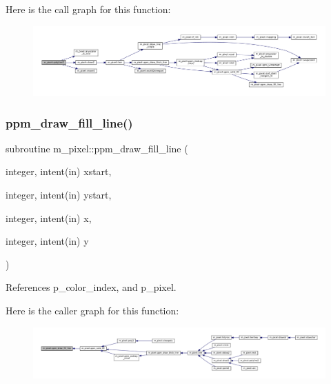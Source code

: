 Here is the call graph for this function\+:
\nopagebreak
\begin{figure}[H]
\begin{center}
\leavevmode
\includegraphics[width=350pt]{namespacem__pixel_a0678be124889fb633475a6724ddb6640_cgraph}
\end{center}
\end{figure}
\mbox{\label{namespacem__pixel_a6f75bc951acd07267e0841ca5985d8b7}} 
\subsubsection{\texorpdfstring{ppm\+\_\+draw\+\_\+fill\+\_\+line()}{ppm\_draw\_fill\_line()}}
{\footnotesize\ttfamily subroutine m\+\_\+pixel\+::ppm\+\_\+draw\+\_\+fill\+\_\+line (\begin{DoxyParamCaption}\item[{integer, intent(in)}]{xstart,  }\item[{integer, intent(in)}]{ystart,  }\item[{integer, intent(in)}]{x,  }\item[{integer, intent(in)}]{y }\end{DoxyParamCaption})\hspace{0.3cm}{\ttfamily [private]}}



References p\+\_\+color\+\_\+index, and p\+\_\+pixel.

Here is the caller graph for this function\+:
\nopagebreak
\begin{figure}[H]
\begin{center}
\leavevmode
\includegraphics[width=350pt]{namespacem__pixel_a6f75bc951acd07267e0841ca5985d8b7_icgraph}
\end{center}
\end{figure}
\mbox{\label{namespacem__pixel_a1629b7134d0ea4b0f301ca23df764b8e}} 
